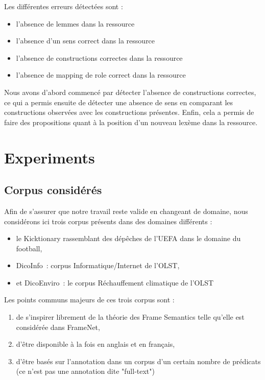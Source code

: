 Les différentes erreurs détectées sont :
\begin{itemize}
    \item l'absence de lemmes dans la ressource
    \item l'absence d'un sens correct dans la ressource
    \item l'absence de constructions correctes dans la ressource
    \item l'absence de mapping de role correct dans la ressource
\end{itemize}

Nous avons d'abord commencé par détecter l'absence de constructions correctes,
ce qui a permis ensuite de détecter une absence de sens en comparant les
constructions observées avec les constructions présentes. Enfin, cela a permis
de faire des propositions quant à la position d'un nouveau lexème dans la
ressource.

\section{Experiments}


\subsection{Corpus considérés}

Afin de s'assurer que notre travail reste valide en changeant de domaine, nous
considérons ici trois corpus présents dans des domaines différents :

\begin{itemize}
    \item le Kicktionary rassemblant des dépêches de l'UEFA dans le domaine du football,
    \item DicoInfo~: corpus Informatique/Internet de l'OLST,
    \item et DicoEnviro~: le corpus Réchauffement climatique de l'OLST
\end{itemize}

Les points communs majeurs de ces trois corpus sont :
\begin{enumerate}
    \item de s'inspirer librement de la théorie des Frame Semantics telle qu'elle est considérée dans FrameNet,
    \item d'être disponible à la fois en anglais et en français,
    \item d'être basés sur l'annotation dans un corpus d'un certain nombre de prédicats (ce n'est pas une annotation dite "full-text")
\end{enumerate}

